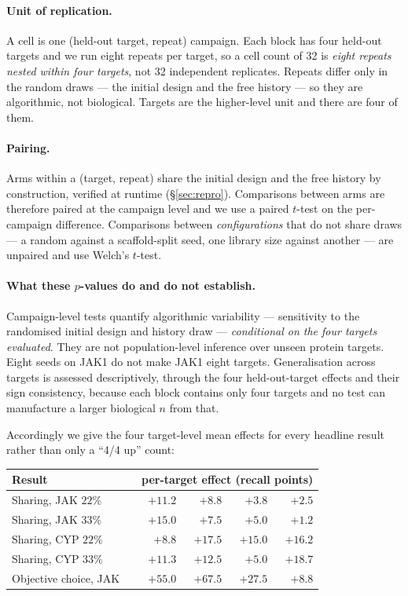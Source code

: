 \documentclass[11pt]{article}
\begin{document}
\paragraph{Unit of replication.} A cell is one (held-out target, repeat)
campaign. Each block has four held-out targets and we run eight repeats per
target, so a cell count of 32 is \emph{eight repeats nested within four
targets}, not 32 independent replicates. Repeats differ only in the random
draws --- the initial design and the free history --- so they are algorithmic,
not biological. Targets are the higher-level unit and there are four of them.

\paragraph{Pairing.} Arms within a (target, repeat) share the initial design and
the free history by construction, verified at runtime (\S\ref{sec:repro}).
Comparisons between arms are therefore paired at the campaign level and we use a
paired $t$-test on the per-campaign difference. Comparisons between
\emph{configurations} that do not share draws --- a random against a
scaffold-split seed, one library size against another --- are unpaired and use
Welch's $t$-test.

\paragraph{What these $p$-values do and do not establish.} Campaign-level
tests quantify algorithmic variability --- sensitivity to the randomised initial
design and history draw --- \emph{conditional on the four targets evaluated}.
They are not population-level inference over unseen protein targets. Eight seeds
on JAK1 do not make JAK1 eight targets. Generalisation across targets is
assessed descriptively, through the four held-out-target effects and their sign
consistency, because each block contains only four targets and no test can
manufacture a larger biological $n$ from that.

Accordingly we give the four target-level mean effects for every headline
result rather than only a ``4/4 up'' count:

\begin{center}\small
\begin{tabular}{llrrrr}
\toprule
Result & & \multicolumn{4}{c}{per-target effect (recall points)} \\
\midrule
Sharing, JAK $22\%$   & & $+11.2$ & $+8.8$  & $+3.8$  & $+2.5$ \\
Sharing, JAK $33\%$   & & $+15.0$ & $+7.5$  & $+5.0$  & $+1.2$ \\
Sharing, CYP $22\%$   & & $+8.8$  & $+17.5$ & $+15.0$ & $+16.2$ \\
Sharing, CYP $33\%$   & & $+11.3$ & $+12.5$ & $+5.0$  & $+18.7$ \\
Objective choice, JAK & & $+55.0$ & $+67.5$ & $+27.5$ & $+8.8$ \\
\bottomrule
\end{tabular}
\end{center}
\end{document}
